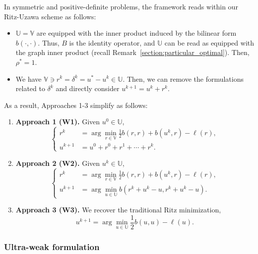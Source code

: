 \documentclass{article}
\theoremstyle{definition}
\begin{document}
In symmetric and positive-definite problems, the framework reads within our Ritz-Uzawa scheme as follows:
\begin{itemize}
    \item $\mathbb{U}=\mathbb{V}$ are equipped with the inner product induced by the bilinear form $b(\cdot,\cdot)$. Thus, $B$ is the identity operator, and $\mathbb{U}$ can be read as equipped with the graph inner product (recall Remark~\ref{section:particular_optimal}).
Then, $\rho^*=1$.
    \item We have $\mathbb{V}\ni r^k = \delta^k = u^* - u^k\in\mathbb{U}$.
Then, we can remove the formulations related to $\delta^k$ and directly consider $u^{k+1} = u^k + r^k$.
\end{itemize} As a result, Approaches 1-3 simplify as follows:
    \begin{enumerate}
        \item[] \textbf{Approach 1 (W1).} Given $u^0\in\mathbb U$,\begin{equation}
    \left\{
    \begin{aligned}
        r^{k} &=  \displaystyle\arg\min_{r\in \mathbb{V}}\frac{1}{2} b(r,r) + b(u^k,r)-\ell(r),\\[2ex]
        u^{k+1} &= u^0 + r^0 + r^1 + \cdots + r^k.
\end{aligned}
    \right.
    \label{eq:Uzawa_continuous1}
\end{equation}
        \item[] \textbf{Approach 2 (W2).} Given $u^k\in\mathbb U$,\begin{equation}
    \left\{
    \begin{aligned}
        r^{k} &=  \displaystyle\arg\min_{r\in \mathbb{V}}\frac{1}{2} b(r,r) + b(u^k,r)-\ell(r),\\[2ex]
        u^{k+1} &= \displaystyle\arg\min_{u\in\mathbb{U}} b(r^k + u^k - u, r^k + u^k - u).
\end{aligned}
    \right.
    \label{eq:Uzawa_continuous2}
\end{equation}
         \item [] \textbf{Approach 3 (W3).} We recover the traditional Ritz minimization,
\begin{equation}
        u^{k+1} =  \displaystyle\arg\min_{u\in \mathbb{U}}\frac{1}{2} b\left(u,u\right)-\ell(u).
\end{equation}
    \end{enumerate}



\subsubsection{Ultra-weak formulation}\label{section:ultraweak}
\end{document}
